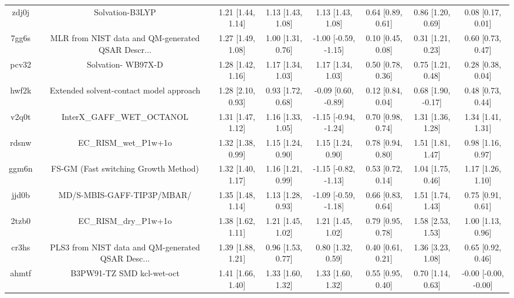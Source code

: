 \documentclass{article}
\begin{document}
\begin{center}
\begin{longtable}{|cccccccc|}
 zdj0j &                                    Solvation-B3LYP &  1.21 [1.44, 1.14] &  1.13 [1.43, 1.08] &     1.13 [1.43, 1.08] &  0.64 [0.89, 0.61] &     0.86 [1.20, 0.69] &     0.08 [0.17, 0.01] \\
 7gg6s &  MLR from NIST data and QM-generated QSAR Descr... &  1.27 [1.49, 1.08] &  1.00 [1.31, 0.76] &  -1.00 [-0.59, -1.15] &  0.10 [0.45, 0.08] &     0.31 [1.21, 0.23] &     0.60 [0.73, 0.47] \\
 pcv32 &                                 Solvation- WB97X-D &  1.28 [1.42, 1.16] &  1.17 [1.34, 1.03] &     1.17 [1.34, 1.03] &  0.50 [0.78, 0.36] &     0.75 [1.21, 0.48] &     0.28 [0.38, 0.04] \\
 hwf2k &            Extended solvent-contact model approach &  1.28 [2.10, 0.93] &  0.93 [1.72, 0.68] &   -0.09 [0.60, -0.89] &  0.12 [0.84, 0.04] &    0.68 [1.90, -0.17] &     0.48 [0.73, 0.44] \\
 v2q0t &                         InterX\_GAFF\_WET\_OCTANOL &  1.31 [1.47, 1.12] &  1.16 [1.33, 1.05] &  -1.15 [-0.94, -1.24] &  0.70 [0.98, 0.74] &     1.31 [1.36, 1.28] &     1.34 [1.41, 1.31] \\
 rdsnw &                              EC\_RISM\_wet\_P1w+1o &  1.32 [1.38, 0.99] &  1.15 [1.24, 0.90] &     1.15 [1.24, 0.90] &  0.78 [0.94, 0.80] &     1.51 [1.81, 1.47] &     0.98 [1.16, 0.97] \\
 ggm6n &               FS-GM (Fast switching Growth Method) &  1.32 [1.40, 1.17] &  1.16 [1.21, 0.99] &  -1.15 [-0.82, -1.13] &  0.53 [0.72, 0.14] &     1.04 [1.75, 0.46] &     1.17 [1.26, 1.10] \\
 jjd0b &                         MD/S-MBIS-GAFF-TIP3P/MBAR/ &  1.35 [1.48, 1.14] &  1.13 [1.28, 0.93] &  -1.09 [-0.59, -1.18] &  0.66 [0.83, 0.64] &     1.51 [1.74, 1.43] &     0.75 [0.91, 0.61] \\
 2tzb0 &                              EC\_RISM\_dry\_P1w+1o &  1.38 [1.62, 1.11] &  1.21 [1.45, 1.02] &     1.21 [1.45, 1.02] &  0.79 [0.95, 0.78] &     1.58 [2.53, 1.53] &     1.00 [1.13, 0.96] \\
 cr3hs &  PLS3 from NIST data and QM-generated QSAR Desc... &  1.39 [1.88, 1.21] &  0.96 [1.53, 0.77] &     0.80 [1.32, 0.59] &  0.40 [0.61, 0.21] &     1.36 [3.23, 1.08] &     0.65 [0.92, 0.46] \\
 ahmtf &                          B3PW91-TZ SMD kcl-wet-oct &  1.41 [1.66, 1.40] &  1.33 [1.60, 1.32] &     1.33 [1.60, 1.32] &  0.55 [0.95, 0.40] &     0.70 [1.14, 0.63] &  -0.00 [-0.00, -0.00] \\

\end{longtable}
\end{center}
\end{document}
